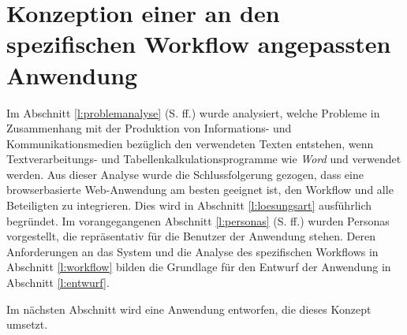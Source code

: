 \section{Konzeption einer an den spezifischen Workflow angepassten Anwendung}\label{l:konzeption}

Im Abschnitt \ref{l:problemanalyse} (S.\pageref{l:problemanalyse} ff.) wurde analysiert, welche Probleme in Zusammenhang mit der Produktion von Informations- und Kommunikationsmedien bezüglich den verwendeten Texten entstehen, wenn Textverarbeitungs- und Tabellenkalkulationsprogramme wie  \emph{Word} und  verwendet werden. Aus dieser Analyse wurde die Schlussfolgerung gezogen, dass eine browserbasierte Web-Anwendung am besten geeignet ist, den Workflow und alle Beteiligten zu integrieren. Dies wird in Abschnitt \ref{l:loesungsart} ausführlich begründet. Im vorangegangenen Abschnitt \ref{l:personas} (S.\pageref{l:personas} ff.) wurden Personas vorgestellt, die repräsentativ für die Benutzer der Anwendung stehen. Deren Anforderungen an das System und die Analyse des spezifischen Workflows in Abschnitt \ref{l:workflow} bilden die Grundlage für den Entwurf der Anwendung in Abschnitt \ref{l:entwurf}.









\bigskip

Im nächsten Abschnitt wird eine Anwendung entworfen, die dieses Konzept umsetzt.

\pagebreak